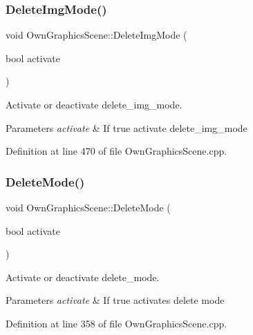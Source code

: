 \mbox{\label{classOwnGraphicsScene_aefe52a5b20dbb38dcc9d9510ecfabe52}} 
\subsubsection{\texorpdfstring{Delete\+Img\+Mode()}{DeleteImgMode()}}
{\footnotesize\ttfamily void Own\+Graphics\+Scene\+::\+Delete\+Img\+Mode (\begin{DoxyParamCaption}\item[{bool}]{activate }\end{DoxyParamCaption})}



Activate or deactivate delete\+\_\+img\+\_\+mode. 


\begin{DoxyParams}{Parameters}
{\em activate} & If true activate delete\+\_\+img\+\_\+mode \\
\hline
\end{DoxyParams}


Definition at line 470 of file Own\+Graphics\+Scene.\+cpp.

\mbox{\label{classOwnGraphicsScene_aca454942ecf6c472d020e063862464d4}} 
\subsubsection{\texorpdfstring{Delete\+Mode()}{DeleteMode()}}
{\footnotesize\ttfamily void Own\+Graphics\+Scene\+::\+Delete\+Mode (\begin{DoxyParamCaption}\item[{bool}]{activate }\end{DoxyParamCaption})}



Activate or deactivate delete\+\_\+mode. 


\begin{DoxyParams}{Parameters}
{\em activate} & If true activates delete mode \\
\hline
\end{DoxyParams}


Definition at line 358 of file Own\+Graphics\+Scene.\+cpp.

